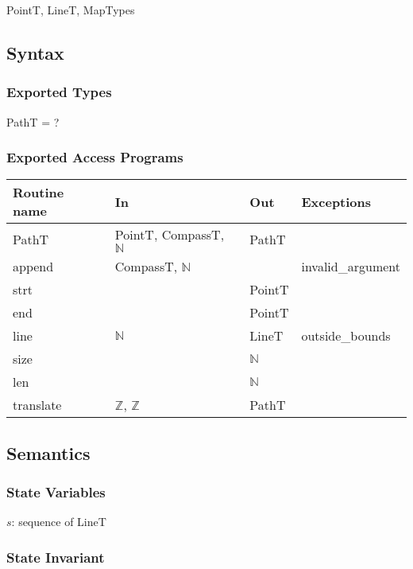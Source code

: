\documentclass[12pt]{article}
\begin{document}
PointT, LineT, MapTypes

\subsection* {Syntax}

\subsubsection* {Exported Types}

PathT = ?

\subsubsection* {Exported Access Programs}

\begin{tabular}{| l | l | l | l |}
\hline
\textbf{Routine name} & \textbf{In} & \textbf{Out} & \textbf{Exceptions}\\
\hline
PathT & PointT, CompassT, $\mathbb{N}$ & PathT & \\ %
\hline
append & CompassT, $\mathbb{N}$ & & invalid\_argument\\ 
\hline
strt & ~ & PointT & ~\\
\hline
end & ~ & PointT & ~\\
\hline
line & $\mathbb{N}$ & LineT & outside\_bounds\\
\hline
size & ~ & $\mathbb{N}$ & \\
\hline
 len & ~ & $\mathbb{N}$ & ~\\
\hline
translate & $\mathbb{Z}$, $\mathbb{Z}$ & PathT  & ~\\
\hline
\end{tabular}

\subsection* {Semantics}

\subsubsection* {State Variables}

$s$: sequence of LineT

\subsubsection* {State Invariant}
\end{document}
